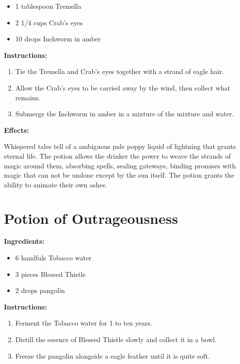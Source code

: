 \documentclass{article}
\begin{document}
\begin{itemize}
  \item 1 tablespoon Tremella
  \item 2 1/4 cups Crab's eyes
  \item 10 drops Inchworm in amber
\end{itemize}

\textbf{Instructions:}

\begin{enumerate}
  \item Tie the Tremella and Crab's eyes together with a strand of eagle hair.
  \item Allow the Crab's eyes to be carried away by the wind, then collect what remains.
  \item Submerge the Inchworm in amber in a mixture of the mixture and water.
\end{enumerate}

\textbf{Effects:}

Whispered tales tell of a ambiguous pale poppy liquid of lightning that grants eternal life. The potion allows the drinker the power to weave the strands of magic around them, absorbing spells, sealing gateways, binding promises with magic that can not be undone except by the sun itself. The potion grants the ability to animate their own ashes.

\newpage
\section*{Potion of Outrageousness}

\textbf{Ingredients:}

\begin{itemize}
  \item 6 handfuls Tobacco water
  \item 3 pieces Blessed Thistle
  \item 2 drops pangolin
\end{itemize}

\textbf{Instructions:}

\begin{enumerate}
  \item Ferment the Tobacco water for 1 to ten years.
  \item Distill the essence of Blessed Thistle slowly and collect it in a bowl.
  \item Freeze the pangolin alongside a eagle feather until it is quite soft.
\end{enumerate}
\end{document}
